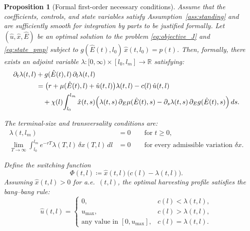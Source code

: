\documentclass[10pt,a4paper]{amsart}
\newtheorem{proposition}{Proposition}
\begin{document}
\begin{proposition}[Formal first-order necessary conditions]
\label{prop:necessary}
Assume that the coefficients, controls, and state variables satisfy
Assumption~\ref{ass:standing} and are sufficiently smooth for integration by parts to
be justified formally. Let $(\hat u, \hat x, \hat E)$ be an optimal solution to the problem
\eqref{eq:objective_J} and \eqref{eq:state_pmp} subject to
$g(\hat E(t),l_0)\,\hat x(t,l_0)=p(t)$. 
Then, formally, there exists an adjoint variable
$\lambda:[0,\infty)\times[l_0,l_m]\to\mathbb{R}$ satisfying:
\begin{align}\label{eq:adjoint}
\partial_t \lambda(t,l) &+ g(\hat E(t),l)\,\partial_l \lambda(t,l) \notag\\
&= \bigl(r + \mu(\hat E(t),l) + \hat u(t,l)\bigr)\lambda(t,l) - c(l)\,\hat u(t,l)
\notag \\
&\quad + \chi(l)\!\int_{l_0}^{l_m} \hat x(t,s) \Big(
   \lambda(t,s)\,\partial_E\mu(\hat E(t),s)
   - \partial_s\lambda(t,s)\,\partial_Eg(\hat E(t),s) \Big)\,ds.
\end{align}

The terminal-size and transversality conditions are:
\begin{align}
\lambda(t,l_m) &= 0 \qquad \text{for } t \ge 0,
   \label{eq:adjoint_boundary} \\
\lim_{T\to\infty} \int_{l_0}^{l_m} e^{-rT}\lambda(T,l)\,\delta x(T,l)\,dl &= 0
   \qquad \text{for every admissible variation } \delta x.
   \label{eq:transversality}
\end{align}

Define the switching function
\begin{equation}\label{eq:switching}
\Phi(t,l) \coloneqq \hat x(t,l)\bigl( c(l) - \lambda(t,l) \bigr).
\end{equation}
Assuming $\hat x(t,l)>0$ for a.e.\ $(t,l)$, the optimal harvesting profile satisfies the
bang--bang rule:
\begin{equation}\label{eq:opt_control}
\hat u(t,l)=
\begin{cases}
0, & c(l)<\lambda(t,l),\\[4pt]
u_{\max}, & c(l)>\lambda(t,l),\\[4pt]
\text{any value in }[0,u_{\max}], & c(l)=\lambda(t,l).
\end{cases}
\end{equation}
\end{proposition}
\end{document}
